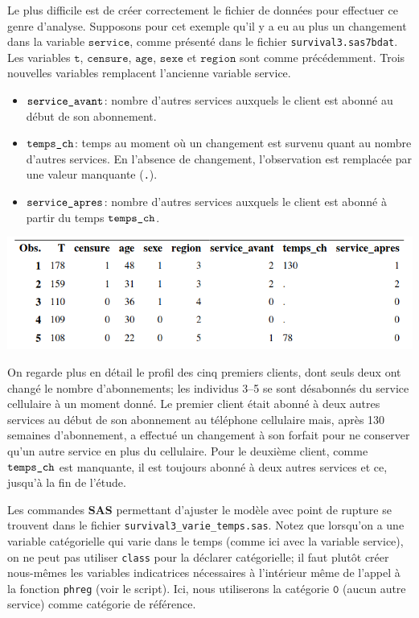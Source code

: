 \documentclass[
  11pt,
  letterpaper,
]{book}
\providecommand{\tightlist}{%
  \setlength{\itemsep}{0pt}\setlength{\parskip}{0pt}}
\theoremstyle{definition}
\theoremstyle{definition}
\theoremstyle{definition}
\theoremstyle{remark}
\begin{document}
Le plus difficile est de créer correctement le fichier de données pour effectuer ce genre d'analyse. Supposons pour cet exemple qu'il y a eu au plus un changement dans la variable \(\texttt{service}\), comme présenté dans le fichier \texttt{survival3.sas7bdat}. Les variables \(\texttt{t}\), \(\texttt{censure}\), \(\texttt{age}\), \(\texttt{sexe}\) et \(\texttt{region}\) sont comme précédemment. Trois nouvelles variables remplacent l'ancienne variable service.

\begin{itemize}
\tightlist
\item
  \(\verb+service_avant+\): nombre d'autres services auxquels le client est abonné au début de son abonnement.
\item
  \(\verb+temps_ch+\): temps au moment où un changement est survenu quant au nombre d'autres services. En l'absence de changement, l'observation est remplacée par une valeur manquante (\texttt{.}).
\item
  \(\verb+service_apres+\): nombre d'autres services auxquels le client est abonné à partir du temps \(\verb+temps_ch+\).
\end{itemize}

\begin{center}\includegraphics[width=0.8\linewidth]{figures/05-survie-e21} \end{center}

On regarde plus en détail le profil des cinq premiers clients, dont seuls deux ont changé le nombre d'abonnements; les individus 3--5 se sont désabonnés du service cellulaire à un moment donné. Le premier client était abonné à deux autres services au début de son abonnement au téléphone cellulaire mais, après 130 semaines d'abonnement, a effectué un changement à son forfait pour ne conserver qu'un autre service en plus du cellulaire. Pour le deuxième client, comme \(\verb+temps_ch+\) est manquante, il est toujours abonné à deux autres services et ce, jusqu'à la fin de l'étude.

Les commandes \textbf{SAS} permettant d'ajuster le modèle avec point de rupture se trouvent dans le fichier \texttt{survival3\_varie\_temps.sas}. Notez que lorsqu'on a une variable catégorielle qui varie dans le temps (comme ici avec la variable service), on ne peut pas utiliser \texttt{class} pour la déclarer catégorielle; il faut plutôt créer nous-mêmes les variables indicatrices nécessaires à l'intérieur même de l'appel à la fonction \texttt{phreg} (voir le script). Ici, nous utiliserons la catégorie \(\texttt{0}\) (aucun autre service) comme catégorie de référence.
\end{document}
